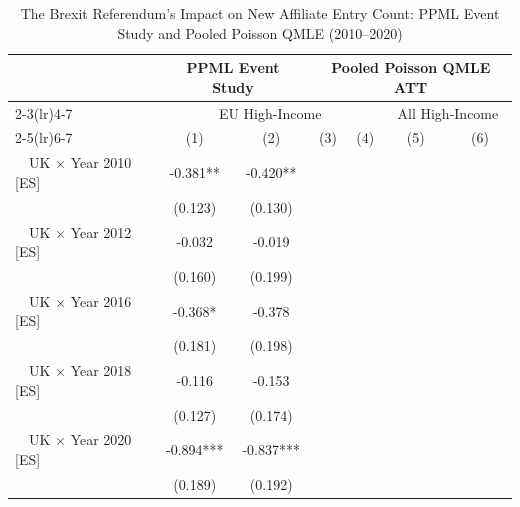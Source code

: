 \begin{table}[!ht]\centering\caption{\label{tab:entry2010combined}The Brexit Referendum's Impact on New Affiliate Entry Count: PPML Event Study and Pooled Poisson QMLE (2010--2020)}\begin{threeparttable}\begin{tabular}{l*{6}{c}}\toprule
\multicolumn{1}{c}{} & \multicolumn{2}{c}{PPML Event Study} & \multicolumn{4}{c}{Pooled Poisson QMLE ATT} \\
\cmidrule(lr){2-3}\cmidrule(lr){4-7}
\multicolumn{1}{c}{} & \multicolumn{4}{c}{EU High-Income} & \multicolumn{2}{c}{All High-Income} \\
\cmidrule(lr){2-5}\cmidrule(lr){6-7}

                    &\multicolumn{1}{c}{(1)}&\multicolumn{1}{c}{(2)}&\multicolumn{1}{c}{(3)}&\multicolumn{1}{c}{(4)}&\multicolumn{1}{c}{(5)}&\multicolumn{1}{c}{(6)}\\
\midrule
~~UK $\times$ Year 2010 [ES]&      -0.381** &      -0.420** &               &               &               &               \\
                    &     (0.123)   &     (0.130)   &               &               &               &               \\
~~UK $\times$ Year 2012 [ES]&      -0.032   &      -0.019   &               &               &               &               \\
                    &     (0.160)   &     (0.199)   &               &               &               &               \\
~~UK $\times$ Year 2016 [ES]&      -0.368*  &      -0.378   &               &               &               &               \\
                    &     (0.181)   &     (0.198)   &               &               &               &               \\
~~UK $\times$ Year 2018 [ES]&      -0.116   &      -0.153   &               &               &               &               \\
                    &     (0.127)   &     (0.174)   &               &               &               &               \\
~~UK $\times$ Year 2020 [ES]&      -0.894***&      -0.837***&               &               &               &               \\
                    &     (0.189)   &     (0.192)   &               &               &               &               \\

\end{tabular}
\end{threeparttable}
\end{table}
